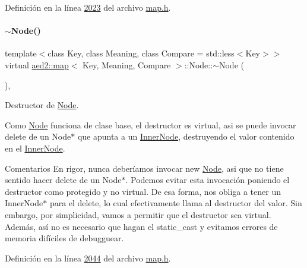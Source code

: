 Definición en la línea \hyperlink{map_8h_source_l02023}{2023} del archivo \hyperlink{map_8h_source}{map.\+h}.

\mbox{\label{structaed2_1_1map_1_1Node_a4f3cb2cc4302fe96432e624ced147540_a4f3cb2cc4302fe96432e624ced147540}} 
\paragraph{\texorpdfstring{$\sim$\+Node()}{~Node()}}
{\footnotesize\ttfamily template$<$class Key, class Meaning, class Compare = std\+::less$<$\+Key$>$$>$ \\
virtual \hyperlink{classaed2_1_1map}{aed2\+::map}$<$ Key, Meaning, Compare $>$\+::Node\+::$\sim$\+Node (\begin{DoxyParamCaption}{ }\end{DoxyParamCaption})\hspace{0.3cm}{\ttfamily [inline]}, {\ttfamily [virtual]}}



Destructor de \hyperlink{structaed2_1_1map_1_1Node}{Node}. 

Como \hyperlink{structaed2_1_1map_1_1Node}{Node} funciona de clase base, el destructor es virtual, asi se puede invocar delete de un Node$\ast$ que apunta a un \hyperlink{structaed2_1_1map_1_1InnerNode}{Inner\+Node}, destruyendo el valor contenido en el \hyperlink{structaed2_1_1map_1_1InnerNode}{Inner\+Node}.

\begin{DoxyRemark}{Comentarios}
En rigor, nunca deberíamos invocar new \hyperlink{structaed2_1_1map_1_1Node}{Node}, asi que no tiene sentido hacer delete de un Node$\ast$. Podemos evitar esta invocación poniendo el destructor como protegido y no virtual. De esa forma, nos obliga a tener un Inner\+Node$\ast$ para el delete, lo cual efectivamente llama al destructor del valor. Sin embargo, por simplicidad, vamos a permitir que el destructor sea virtual. Además, así no es necesario que hagan el {\ttfamily static\+\_\+cast} y evitamos errores de memoria difíciles de debugguear. 
\end{DoxyRemark}


Definición en la línea \hyperlink{map_8h_source_l02044}{2044} del archivo \hyperlink{map_8h_source}{map.\+h}.




